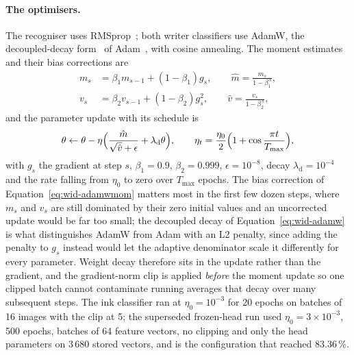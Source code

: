 \paragraph{The optimisers.}
The recogniser uses RMSprop~\cite[Lec.~6e]{tieleman2012}; both writer classifiers use AdamW, the decoupled-decay form~\cite[Alg.~2]{loshchilov2019} of Adam~\cite[Alg.~1]{kingma2015}, with cosine annealing. The moment estimates and their bias corrections are
\begin{align}
m_s&=\beta_1m_{s-1}+(1-\beta_1)g_s,\qquad \hat m=\frac{m_s}{1-\beta_1^{\,s}},\nonumber\\
v_s&=\beta_2v_{s-1}+(1-\beta_2)g_s^2,\qquad \hat v=\frac{v_s}{1-\beta_2^{\,s}},\label{eq:wid-adamwmom}
\end{align}
and the parameter update with its schedule is
\begin{equation}
\theta\leftarrow\theta-\eta\Bigl(\frac{\hat m}{\sqrt{\hat v}+\epsilon}+\lambda_{\mathrm d}\theta\Bigr),\qquad\eta_t=\frac{\eta_0}{2}\Bigl(1+\cos\frac{\pi t}{T_{\max}}\Bigr),\label{eq:wid-adamw}
\end{equation}
with $g_s$ the gradient at step $s$, $\beta_1=0.9$, $\beta_2=0.999$, $\epsilon=10^{-8}$, decay $\lambda_{\mathrm d}=10^{-4}$ and the rate falling from $\eta_0$ to zero over $T_{\max}$ epochs. The bias correction of Equation~\ref{eq:wid-adamwmom} matters most in the first few dozen steps, where $m_s$ and $v_s$ are still dominated by their zero initial values and an uncorrected update would be far too small; the decoupled decay of Equation~\ref{eq:wid-adamw} is what distinguishes AdamW from Adam with an L2 penalty, since adding the penalty to $g_s$ instead would let the adaptive denominator scale it differently for every parameter. Weight decay therefore sits in the update rather than the gradient, and the gradient-norm clip is applied \emph{before} the moment update so one clipped batch cannot contaminate running averages that decay over many subsequent steps. The ink classifier ran at $\eta_0=10^{-3}$ for 20 epochs on batches of 16 images with the clip at 5; the superseded frozen-head run used $\eta_0=3\times10^{-3}$, 500 epochs, batches of 64 feature vectors, no clipping and only the head parameters on 3\,680 stored vectors, and is the configuration that reached 83.36\,\%.


